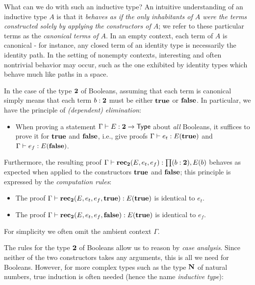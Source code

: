 What can we do with such an inductive type? An intuitive understanding of an inductive type $A$ is that it \emph{behaves as if the only inhabitants of $A$ were the terms constructed solely by applying the constructors of $A$}; we refer to these particular terms as the \emph{canonical terms of $A$}. In an empty context,
each term of $A$ is canonical - for instance, any closed term of an identity type is necessarily the identity path. In the setting of nonempty contexts,  
interesting and often nontrivial behavior may occur, such as the one exhibited by identity types which behave much like paths in a space.

In the case of the type $\mathbf{2}$ of Booleans, assuming that each term is canonical simply means that each term $b : \mathbf{2}$ must be either $\mathbf{true}$ or $\mathbf{false}$. In particular, we have the principle of \emph{(dependent) elimination}:

\begin{itemize}
\item When proving a statement $\Gamma \vdash E : \mathbf{2} \to \mathsf{Type}$ about \emph{all} Booleans, it suffices to prove it for $\mathbf{true}$ and $\mathbf{false}$, i.e., give proofs
$\Gamma \vdash e_t : E(\mathbf{true})$ and $\Gamma \vdash e_f : E(\mathbf{false})$.
\end{itemize}

Furthermore, the resulting proof $\Gamma \der \rec_\two(E,e_t,e_f): \prd{b : \two}E(b)$ behaves as expected when applied to the constructors $\mathbf{true}$ and $\mathbf{false}$; this principle is expressed by the \emph{computation rules}:
\begin{itemize}
\item The proof $\Gamma \vdash \mathbf{rec}_\mathbf{2}(E,e_t,e_f,\mathbf{true}) : E(\mathbf{true})$ is identical to $e_t$.
\item The proof $\Gamma \vdash \mathbf{rec}_\mathbf{2}(E,e_t,e_f,\mathbf{false}) : E(\mathbf{true})$ is identical to $e_f$.
\end{itemize}
For simplicity we often omit the ambient context $\Gamma$.

The rules for the type $\mathbf{2}$ of Booleans allow us to reason by \emph{case analysis}. Since neither of the two constructors takes any arguments, this is all we need for Booleans. However, for more complex types such as the type $\mathbf{N}$ of natural numbers, true induction is often needed (hence the name \emph{inductive type}):

